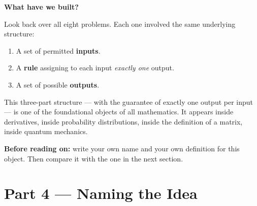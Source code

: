 \documentclass[12pt, a4paper]{article}
\newcounter{problem}
\begin{document}
\begin{discoverybox}
\textbf{What have we built?}

Look back over all eight problems. Each one involved the same underlying structure:

\begin{enumerate}
  \item A set of permitted \textbf{inputs}.
  \item A \textbf{rule} assigning to each input \emph{exactly one} output.
  \item A set of possible \textbf{outputs}.
\end{enumerate}

This three-part structure --- with the guarantee of exactly one output per input --- is one of the foundational objects of all mathematics. It appears inside derivatives, inside probability distributions, inside the definition of a matrix, inside quantum mechanics.

\medskip
\textbf{Before reading on:} write your own name and your own definition for this object. Then compare it with the one in the next section.
\end{discoverybox}

\section{Part 4 \texorpdfstring{---}{--} Naming the Idea}
\end{document}
